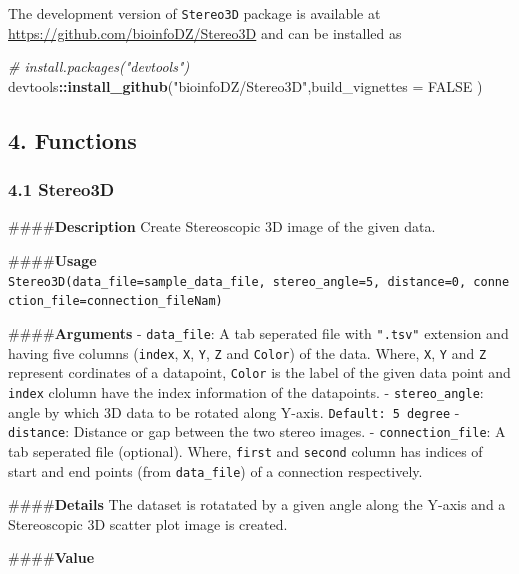 \documentclass[]{article}
\newenvironment{Shaded}{\begin{snugshade}}{\end{snugshade}}
\newcommand{\CommentTok}[1]{\textcolor[rgb]{0.56,0.35,0.01}{\textit{#1}}}
\newcommand{\DataTypeTok}[1]{\textcolor[rgb]{0.13,0.29,0.53}{#1}}
\newcommand{\KeywordTok}[1]{\textcolor[rgb]{0.13,0.29,0.53}{\textbf{#1}}}
\newcommand{\NormalTok}[1]{#1}
\newcommand{\OperatorTok}[1]{\textcolor[rgb]{0.81,0.36,0.00}{\textbf{#1}}}
\newcommand{\OtherTok}[1]{\textcolor[rgb]{0.56,0.35,0.01}{#1}}
\newcommand{\StringTok}[1]{\textcolor[rgb]{0.31,0.60,0.02}{#1}}
\begin{document}
The development version of \texttt{Stereo3D} package is available at
\url{https://github.com/bioinfoDZ/Stereo3D} and can be installed as

\begin{Shaded}
\begin{Highlighting}[]
\CommentTok{# install.packages("devtools")}
\NormalTok{devtools}\OperatorTok{::}\KeywordTok{install_github}\NormalTok{(}\StringTok{"bioinfoDZ/Stereo3D"}\NormalTok{,}\DataTypeTok{build_vignettes =} \OtherTok{FALSE}\NormalTok{ )}
\end{Highlighting}
\end{Shaded}

\hypertarget{functions}{%
\subsection{4. Functions}\label{functions}}

\hypertarget{stereo3d}{%
\subsubsection{4.1 Stereo3D}\label{stereo3d}}

\#\#\#\#\textbf{Description} Create Stereoscopic 3D image of the given
data.

\#\#\#\#\textbf{Usage}
\texttt{Stereo3D(data\_file=sample\_data\_file,\ stereo\_angle=5,\ distance=0,\ connection\_file=connection\_fileNam)}

\#\#\#\#\textbf{Arguments } - \texttt{data\_file}: A tab seperated file
with \texttt{".tsv"} extension and having five columns (\texttt{index},
\texttt{X}, \texttt{Y}, \texttt{Z} and \texttt{Color}) of the data.
Where, \texttt{X}, \texttt{Y} and \texttt{Z} represent cordinates of a
datapoint, \texttt{Color} is the label of the given data point and
\texttt{index} clolumn have the index information of the datapoints. -
\texttt{stereo\_angle}: angle by which 3D data to be rotated along
Y-axis. \texttt{Default:\ 5\ degree} - \texttt{distance}: Distance or
gap between the two stereo images. - \texttt{connection\_file}: A tab
seperated file (optional). Where, \texttt{first} and \texttt{second}
column has indices of start and end points (from \texttt{data\_file}) of
a connection respectively.

\#\#\#\#\textbf{Details} The dataset is rotatated by a given angle along
the Y-axis and a Stereoscopic 3D scatter plot image is created.

\#\#\#\#\textbf{Value}
\end{document}

